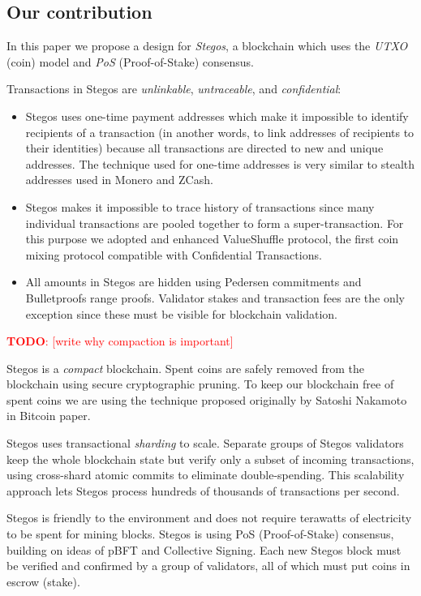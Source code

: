\documentclass[a4paper, 10pt, conference]{ieeeconf}
\newcommand\todo[1]{\textcolor{red}{\textbf{TODO}: [#1]}}
\begin{document}
\subsection{Our contribution}
In this paper we propose a design for \textit{Stegos}, a blockchain which uses the \textit{UTXO} (coin) model and \textit{PoS} (Proof-of-Stake) consensus.

Transactions in Stegos are \textit{unlinkable}, \textit{untraceable}, and \textit{confidential}:

\begin{itemize}
	\item {Stegos uses one-time payment addresses which make it impossible to identify recipients of a transaction (in another words, to link addresses of recipients to their identities) because all transactions are directed to new and unique addresses. The technique used for one-time addresses is very similar to stealth addresses used in Monero and ZCash.}
	\item {Stegos makes it impossible to trace history of transactions since many individual transactions are pooled together to form a super-transaction. For this purpose we adopted and enhanced ValueShuffle protocol\cite{c7}, the first coin mixing protocol compatible with Confidential Transactions.}
	\item {All amounts in Stegos are hidden using Pedersen commitments\cite{c8} and Bulletproofs range proofs\cite{c4}. Validator stakes and transaction fees are the only exception since these must be visible for blockchain validation.}
\end{itemize}

\todo{write why compaction is important}

Stegos is a \textit{compact} blockchain. Spent coins are safely removed from the blockchain using secure cryptographic pruning. To keep our blockchain free of spent coins we are using the technique proposed originally by Satoshi Nakamoto in Bitcoin paper\cite{c1}.

Stegos uses transactional \textit{sharding} to scale. Separate gro\-ups of Stegos validators keep the whole blockchain state but verify only a subset of incoming transactions, using cross-shard atomic commits to eliminate double-spending. This scalability approach lets Stegos process hundreds of thousands of transactions per second.

Stegos is friendly to the environment and does not require terawatts of electricity to be spent for mining blocks. Stegos is using PoS (Proof-of-Stake) consensus, building on ideas of pBFT\cite{c9} and Collective Signing\cite{c10}\cite{c11}. Each new Stegos block must be verified and confirmed by a group of validators, all of which must put coins in escrow (stake).
\end{document}
